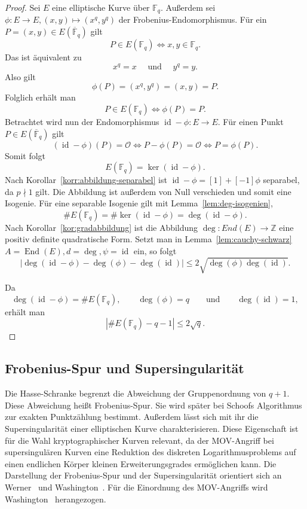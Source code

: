 \begin{proof}
    Sei $E$ eine elliptische Kurve über \(\mathbb{F}_q\). Außerdem sei \(\phi: E\to E, (x,y)\mapsto (x^q,y^q)\) der Frobenius-Endomorphismus. Für ein $P=(x,y)\in E(\overline{\mathbb{F}}_q)$ gilt
    \[
        P\in E(\mathbb{F}_q) \Longleftrightarrow x,y\in \mathbb{F}_q.
    \]
    Das ist äquivalent zu
    \[
        x^q=x \quad \text{ und } \quad y^q=y.
    \]
    Also gilt
    \[
        \phi(P)=(x^q,y^q)=(x,y)=P.
    \]
    Folglich erhält man
    \[
        P\in E(\mathbb{F}_q) \Longleftrightarrow \phi(P)=P.
    \]
    Betrachtet wird nun der Endomorphismus
    \(\operatorname{id}-\phi:E\to E\). Für einen Punkt $P\in E(\overline{\mathbb{F}}_q)$ gilt
    \[
        (\operatorname{id}-\phi)(P)=\mathcal O
        \Leftrightarrow
        P-\phi(P)=\mathcal O
        \Leftrightarrow
        P=\phi(P).
    \]
    Somit folgt
    \[
        E(\mathbb{F}_q)=\ker(\operatorname{id}-\phi).
    \]
    Nach Korollar~\ref{korr:abbildung-separabel} ist $\operatorname{id}-\phi=[1]+[-1]\phi$ separabel, da  $p \nmid 1$ gilt. Die Abbildung ist außerdem von Null verschieden und somit eine Isogenie. Für eine separable Isogenie gilt mit Lemma~\ref{lem:deg-isogenien},
    \[
        \#E(\mathbb{F}_q)
        =\#\ker(\operatorname{id}-\phi)
        =\deg(\operatorname{id}-\phi).
    \]
    Nach Korollar~\ref{kor:gradabbildung} ist die Abbildung $\deg:End(E)\to\mathbb{Z}$ eine positiv definite quadratische Form. Setzt man in Lemma~\ref{lem:cauchy-schwarz} \( A=\operatorname{End}(E), d=\deg,\psi=\operatorname{id}\) ein, so folgt
    \[
        \left|
        \deg(\operatorname{id}-\phi)
        -\deg(\phi)
        -\deg(\operatorname{id})
        \right|
        \leq
        2\sqrt{\deg(\phi)\deg(\operatorname{id})}.
    \]

    Da
    \[
        \deg(\operatorname{id}-\phi)=\#E(\mathbb F_q),
        \qquad
        \deg(\phi)=q
        \qquad\text{und}\qquad
        \deg(\operatorname{id})=1,
    \]
    erhält man
    \[
        \left|
        \#E(\mathbb F_q)-q-1
        \right|
        \leq
        2\sqrt q.
    \]
\end{proof}

\subsection{Frobenius-Spur und Supersingularität}
Die Hasse-Schranke begrenzt die Abweichung der Gruppenordnung
von $q+1$. Diese Abweichung heißt Frobenius-Spur. Sie wird
später bei Schoofs Algorithmus zur exakten Punktzählung
bestimmt. Außerdem lässt sich mit ihr die Supersingularität
einer elliptischen Kurve charakterisieren. Diese Eigenschaft
ist für die Wahl kryptographischer Kurven relevant, da der
MOV-Angriff bei supersingulären Kurven eine Reduktion des
diskreten Logarithmusproblems auf einen endlichen Körper
kleinen Erweiterungsgrades ermöglichen kann. Die Darstellung der Frobenius-Spur und der Supersingularität orientiert sich an Werner~\cite[S.~66--73]{werner02} und Washington~\cite[S.~126--127, 130--139]{washington08}. Für die Einordnung des MOV-Angriffs wird Washington~\cite[S.~156--157]{washington08} herangezogen.

